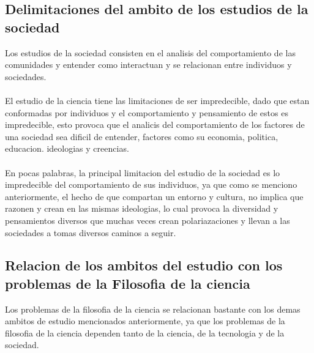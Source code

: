 \subsection{Delimitaciones del ambito de los estudios de la sociedad}

Los estudios de la sociedad consisten en el analisis del comportamiento de las comunidades y entender como interactuan y se relacionan entre individuos y sociedades.\\
\\
El estudio de la ciencia tiene las limitaciones de ser impredecible, dado que estan conformadas por individuos y el comportamiento y pensamiento de estos es impredecible, esto provoca que el analicis del comportamiento de los factores de una sociedad sea dificil de entender, factores como su economia, politica, educacion. ideologias y creencias.\\
\\
En pocas palabras, la principal limitacion del estudio de la sociedad es lo impredecible del comportamiento de sus individuos, ya que como se menciono anteriormente, el hecho de que compartan un entorno y cultura, no implica que razonen y crean en las mismas ideologias, lo cual provoca la diversidad y pensamientos diversos que muchas veces crean polariazaciones y llevan a las sociedades a tomas diversos caminos a seguir.

\subsection{Relacion de los ambitos del estudio con los problemas de la Filosofia de la ciencia}
    
Los problemas de la filosofia de la ciencia se relacionan bastante con los demas ambitos de estudio mencionados anteriormente, ya que los problemas de la filosofia de la ciencia dependen tanto de la ciencia, de la tecnologia y de la sociedad.\\

